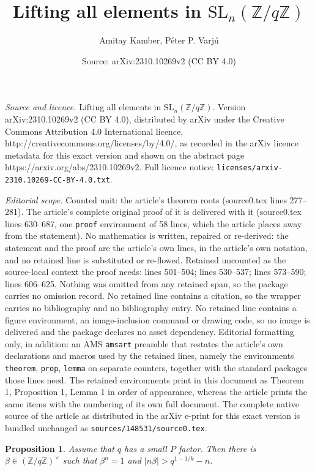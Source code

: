 \documentclass[10pt,a4paper]{amsart}
\title{Lifting all elements in $\mathrm{SL}_n(\mathbb{Z}/q\mathbb{Z})$}
\author{Amitay Kamber, P\'eter P. Varj\'u}
\date{Source: arXiv:2310.10269v2 (CC BY 4.0)}
\newtheorem{prop}{Proposition}
\newcommand{\Z}{\mathbb{Z}}
\begin{document}
\maketitle

\noindent\emph{Source and licence.} Lifting all elements in $\mathrm{SL}_n(\mathbb{Z}/q\mathbb{Z})$. Version arXiv:2310.10269v2 (CC BY 4.0), distributed by arXiv under the Creative Commons Attribution 4.0 International licence, http://creativecommons.org/licenses/by/4.0/, as recorded in the arXiv licence metadata for this exact version and shown on the abstract page https://arxiv.org/abs/2310.10269v2. Full licence notice: \texttt{licenses/arxiv-2310.10269-CC-BY-4.0.txt}.\par\smallskip

\noindent\textit{Editorial scope.} Counted unit: the article's theorem roots (source0.tex lines 277--281). The article's complete original proof of it is delivered with it (source0.tex lines 630--687, one \texttt{proof} environment of 58 lines, which the article places away from the statement). No mathematics is written, repaired or re-derived: the statement and the proof are the article's own lines, in the article's own notation, and no retained line is substituted or re-flowed.  Retained uncounted as the source-local context the proof needs: lines 501--504; lines 530--537; lines 573--590; lines 606--625.  Nothing was omitted from any retained span, so the package carries no omission record.  No retained line contains a citation, so the wrapper carries no bibliography and no bibliography entry.  No retained line contains a figure environment, an image-inclusion command or drawing code, so no image is delivered and the package declares no asset dependency.  Editorial formatting only, in addition: an AMS \texttt{amsart} preamble that restates the article's own declarations and macros used by the retained lines, namely the environments \texttt{theorem}, \texttt{prop}, \texttt{lemma} on separate counters, together with the standard packages those lines need.  The retained environments print in this document as Theorem 1, Proposition 1, Lemma 1 in order of appearance, whereas the article prints the same items with the numbering of its own full document.  The complete native source of the article as distributed in the arXiv e-print for this exact version is bundled unchanged as \texttt{sources/148531/source0.tex}.
\begin{prop}\label{prop:small P factor}
Assume that $q$ has a small $P$ factor. Then there is $\beta\in(\Z/q\Z)^{\times}$
such that $\beta^{n}=1$ and $\left|n\beta\right|>q^{1-1/k}-n$. 
\end{prop}
\end{document}
